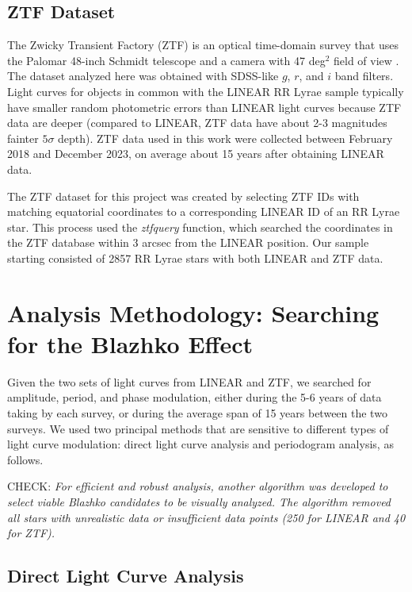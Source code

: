 \subsection{ZTF Dataset}

The Zwicky Transient Factory (ZTF) is an optical time-domain survey that uses the Palomar 48-inch Schmidt telescope
and a camera with 47 deg$^2$ field of view \citep{2019PASP..131a8002B}. The dataset analyzed here was obtained with
SDSS-like $g$, $r$, and $i$ band filters. Light curves for objects in common with the LINEAR RR Lyrae sample typically
have smaller random photometric errors than LINEAR light curves because ZTF data are deeper (compared to LINEAR,
ZTF data have about 2-3 magnitudes fainter  $5\sigma$ depth). ZTF data used in this work were collected between
February 2018 and December 2023, on average about 15 years after obtaining LINEAR data. 

The ZTF dataset for this project was created by selecting ZTF IDs with matching equatorial coordinates to a corresponding
LINEAR ID of an RR Lyrae star. This process used the {\it ztfquery} function, which searched the coordinates in the ZTF database
within 3 arcsec from the LINEAR position. Our sample starting consisted of 2857 RR Lyrae stars with both LINEAR and ZTF data. 



\section{Analysis Methodology: Searching for the Blazhko Effect  \label{sec:analysis}}  

Given the two sets of light curves from LINEAR and ZTF, we searched for amplitude, period, and phase modulation,
either during the 5-6 years of data taking by each survey, or during the average span of 15 years between the two
surveys. We used two principal methods that are sensitive to different types of light curve modulation: direct light
curve analysis and periodogram analysis, as follows.

CHECK: {\it For efficient and robust analysis, another algorithm was developed to select viable Blazhko candidates to be visually analyzed. 
The algorithm removed all stars with unrealistic data or insufficient data points (250 for LINEAR and 40 for ZTF).}


\subsection{Direct Light Curve Analysis}


